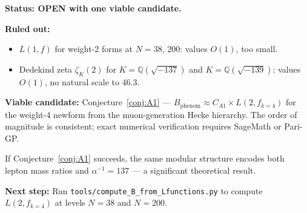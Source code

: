 \documentclass[12pt,a4paper]{article}
\theoremstyle{definition}
\theoremstyle{remark}
\begin{document}
\begin{gapbox}
\textbf{Status: OPEN with one viable candidate.}

\textbf{Ruled out:}
\begin{itemize}
  \item $L(1,f)$ for weight-2 forms at $N = 38$, $200$: values $O(1)$, too small.
  \item Dedekind zeta $\zeta_K(2)$ for $K = \mathbb{Q}(\sqrt{-137})$ and
        $K = \mathbb{Q}(\sqrt{-139})$: values $O(1)$, no natural scale to 46.3.
\end{itemize}

\textbf{Viable candidate:} Conjecture~\ref{conj:A1} ---
$B_{\mathrm{phenom}} \approx C_{A1} \times L(2, f_{k=4})$ for the weight-4
newform from the muon-generation Hecke hierarchy.  The order of magnitude is
consistent; exact numerical verification requires SageMath or Pari-GP.

If Conjecture~\ref{conj:A1} succeeds, the same modular structure encodes both
lepton mass ratios and $\alpha^{-1} = 137$ --- a significant theoretical result.

\textbf{Next step:} Run \texttt{tools/compute\_B\_from\_Lfunctions.py} to
compute $L(2, f_{k=4})$ at levels $N = 38$ and $N = 200$.
\end{gapbox}

\ifdefined\INCLUDEMODE
\else
  
\end{document}
